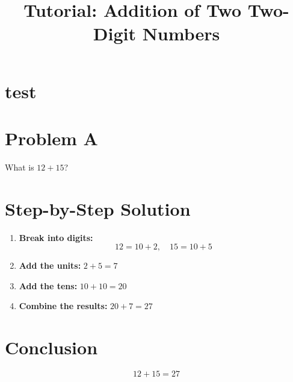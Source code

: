 \documentclass{article}
\begin{document}
\title{Tutorial: Addition of Two Two-Digit Numbers}
\date{}
\maketitle

\section{test}




\section*{Problem A}
What is $12 + 15$?

\section*{Step-by-Step Solution}
\begin{enumerate}[label=Step \arabic*:, leftmargin=*]
    \item \textbf{Break into digits:}
          \[
              12 = 10 + 2,\quad 15 = 10 + 5
          \]

    \item \textbf{Add the units:} $2 + 5 = 7$

    \item \textbf{Add the tens:} $10 + 10 = 20$

    \item \textbf{Combine the results:} $20 + 7 = 27$
\end{enumerate}

\section*{Conclusion}
\[
    12 + 15 = 27
\]
\end{document}
